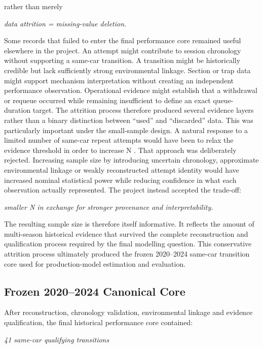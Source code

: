 rather than merely

\begin{center}\textit{data attrition = missing-value deletion.}\end{center}

Some records that failed to enter the final performance core remained useful elsewhere in the project. An attempt might contribute to session chronology without supporting a same-car transition. A transition might be historically credible but lack sufficiently strong environmental linkage. Section or trap data might support mechanism interpretation without creating an independent performance observation. Operational evidence might establish that a withdrawal or requeue occurred while remaining insufficient to define an exact queue-duration target. The attrition process therefore produced several evidence layers rather than a binary distinction between ``used'' and ``discarded'' data. This was particularly important under the small-sample design. A natural response to a limited number of same-car repeat attempts would have been to relax the evidence threshold in order to increase N . That approach was deliberately rejected. Increasing sample size by introducing uncertain chronology, approximate environmental linkage or weakly reconstructed attempt identity would have increased nominal statistical power while reducing confidence in what each observation actually represented. The project instead accepted the trade-off:

\begin{center}\textit{smaller N   in exchange for    stronger provenance and interpretability.}\end{center}

The resulting sample size is therefore itself informative. It reflects the amount of multi-season historical evidence that survived the complete reconstruction and qualification process required by the final modelling question. This conservative attrition process ultimately produced the frozen 2020--2024 same-car transition core used for production-model estimation and evaluation.

\subsection{Frozen 2020--2024 Canonical Core}
After reconstruction, chronology validation, environmental linkage and evidence qualification, the final historical performance core contained:

\begin{center}\textit{41 same-car qualifying transitions}\end{center}

